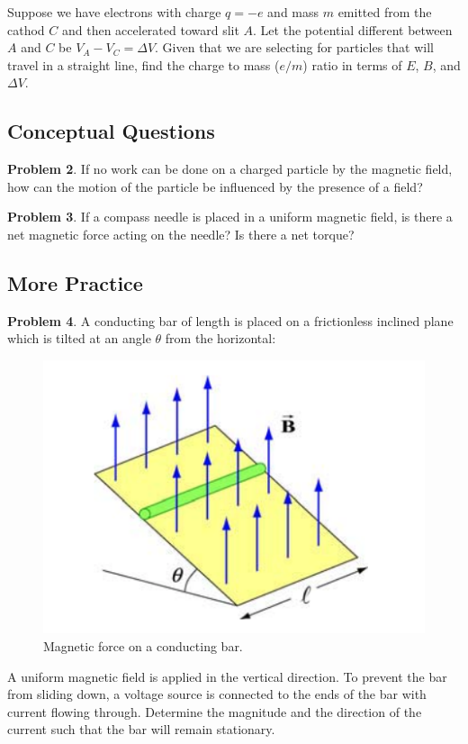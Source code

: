 \documentclass[11pt, letterpaper]{article}
\theoremstyle{definition}
\theoremstyle{remark}
\begin{document}
Suppose we have electrons with charge $q = -e$ and mass $m$ emitted from the cathod $C$ and then accelerated toward slit $A$. Let the potential different between $A$ and $C$ be $V_A - V_C = \Delta V$. Given that we are selecting for particles that will travel in a straight line, find the charge to mass ($e/m$) ratio in terms of $E$, $B$, and $\Delta V$.
\subsection{Conceptual Questions} %
\textbf{Problem 2}.  If no work can be done on a charged particle by the magnetic field, how can the motion of the particle be influenced by the presence of a field?

\textbf{Problem 3}.  If a compass needle is placed in a uniform magnetic field, is there a net magnetic force acting on the needle? Is there a net torque?

\subsection{More Practice} %
\textbf{Problem 4}. A conducting bar of length is placed on a frictionless inclined plane which is tilted at an angle $\theta$ from the horizontal:
\begin{figure}[h!]
	\centering
	\includegraphics[scale=0.7]{sliding-bar}
	\caption{Magnetic force on a conducting bar.}
	\label{fig:bar}
\end{figure}

A uniform magnetic field is applied in the vertical direction. To prevent the bar from
sliding down, a voltage source is connected to the ends of the bar with current flowing
through. Determine the magnitude and the direction of the current such that the bar will
remain stationary.
\end{document}
